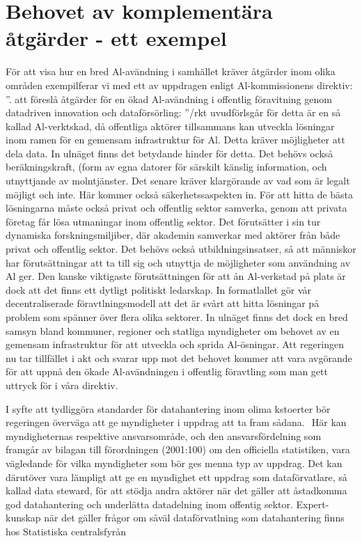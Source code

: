 {{{{{{{\section*{Behovet av komplementära åtgärder - ett exempel}
För att visa hur en bred Al-avändning i samhället kräver åtgärder inom olika områden exempilferar vi med ett av uppdragen enligt Al-kommissionens direktiv: ”. att föreslå åtgärder för en ökad Al-avändning i offentlig föravitning genom datadriven innovation och dataförsörling: ”/rkt uvudförlsgår för detta är en så kallad Al-verktskad, då offentliga aktörer tillsammans kan utveckla lösningar inom ramen för en gemensam infrastruktur för Al. Detta kräver möjligheter att dela data. In ulnäget finns det betydande hinder för detta. Det behövs också beräkningskraft, (form av egna datorer för särskilt känslig information, och utnyttjande av molntjänster. Det senare kräver klargörande av vad som är legalt möjligt och inte. Här kommer också säkerhetssaspekten in.
För att hitta de bästa lösningarna måste också privat och offentlig sektor samverka, genom att privata företag får lösa utmaningar inom offentlig sektor. Det förutsätter i sin tur dynamiska forskningsmiljiber, där akademin samverkar med aktörer från både privat och offentlig sektor. Det behövs också utbildningsinsatser, så att människor har förutsättningar att ta till sig och utnyttja de möjligheter som användning av Al ger.
Den kanske viktigaste förutsättningen för att ån Al-verkstad på plats är dock att det finns ett dytligt politiskt ledarskap. In formatlallet gör vår decentraliserade föravtlningsmodell att det är svårt att hitta lösningar på problem som spänner över flera olika sektorer. In ulnäget finns det dock en bred samsyn bland kommuner, regioner och statliga myndigheter om behovet av en gemensam infrastruktur för att utveckla och sprida Al-ösningar. Att regeringen nu tar tillfället i akt och svarar upp mot det behovet kommer att vara avgörande för att uppnå den ökade Al-avändningen i offentlig föravtling som man gett uttryck för i våra direktiv.

I syfte att tydliggöra standarder för datahantering inom olima kstoerter bör regeringen överväga att ge myndigheter i uppdrag att ta fram sådana. \({ }^{}\) Här kan myndigheternas respektive ansvarsområde, och den ansvarsfördelning som framgår av bilagan till förordningen (2001:100) om den officiella statistiken, vara vägledande för vilka myndigheter som bör ges menna typ av uppdrag. Det kan därutöver vara lämpligt att ge en myndighet ett uppdrag som dataförvatlare, så kallad data steward, för att stödja andra aktörer när det gäller att åstadkomma god datahantering och underlätta datadelning inom offentig sektor. Expert- kunskap när det gäller frågor om såväl dataförvatlning som datahantering finns hos Statistiska centralsfyrån
}}}}}}}
